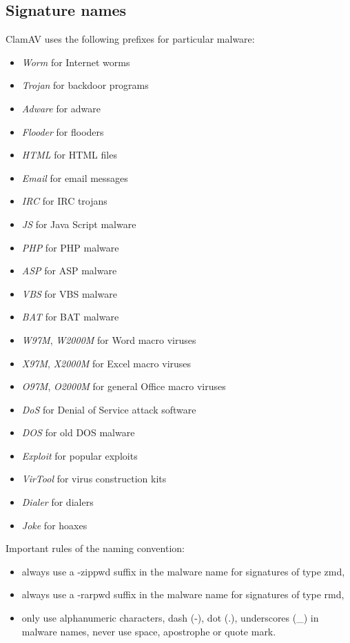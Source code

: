 \documentclass[a4paper,titlepage,12pt]{article}
\begin{document}
    \subsection{Signature names}
    ClamAV uses the following prefixes for particular malware:
    \begin{itemize}
	\item \emph{Worm} for Internet worms
	\item \emph{Trojan} for backdoor programs
	\item \emph{Adware} for adware
	\item \emph{Flooder} for flooders
        \item \emph{HTML} for HTML files
        \item \emph{Email} for email messages
        \item \emph{IRC} for IRC trojans
	\item \emph{JS} for Java Script malware
	\item \emph{PHP} for PHP malware
	\item \emph{ASP} for ASP malware
	\item \emph{VBS} for VBS malware
	\item \emph{BAT} for BAT malware
	\item \emph{W97M}, \emph{W2000M} for Word macro viruses
	\item \emph{X97M}, \emph{X2000M} for Excel macro viruses
	\item \emph{O97M}, \emph{O2000M} for general Office macro viruses
	\item \emph{DoS} for Denial of Service attack software
	\item \emph{DOS} for old DOS malware
	\item \emph{Exploit} for popular exploits
	\item \emph{VirTool} for virus construction kits
	\item \emph{Dialer} for dialers
	\item \emph{Joke} for hoaxes
    \end{itemize}
    Important rules of the naming convention:
    \begin{itemize}
	\item always use a -zippwd suffix in the malware name for signatures of	      type zmd,
	\item always use a -rarpwd suffix in the malware name for signatures
	      of type rmd,
	\item only use alphanumeric characters, dash (-), dot (.), underscores
	      (\_) in malware names, never use space, apostrophe or quote mark.
    \end{itemize}
\end{document}
